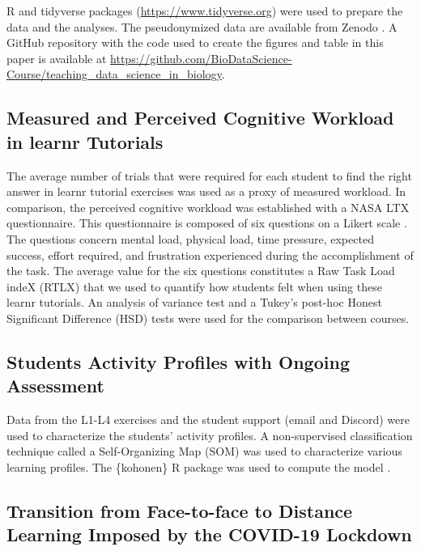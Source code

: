 \documentclass{aims} %
\theoremstyle{definition}
\begin{document}
R and tidyverse \cite{Wickham2019} packages
(\url{https://www.tidyverse.org}) were used to prepare the data and the
analyses. The pseudonymized data are available from Zenodo
\cite{Grosjeandataset2020, Grosjeandataset2019}. A GitHub repository
with the code used to create the figures and table in this paper is
available at
\url{https://github.com/BioDataScience-Course/teaching_data_science_in_biology}.

\hypertarget{measured-and-perceived-cognitive-workload-in-learnr-tutorials}{%
\subsection{Measured and Perceived Cognitive Workload in learnr
Tutorials}\label{measured-and-perceived-cognitive-workload-in-learnr-tutorials}}

The average number of trials that were required for each student to find
the right answer in learnr tutorial exercises was used as a proxy of
measured workload. In comparison, the perceived cognitive workload was
established with a NASA LTX questionnaire. This questionnaire is
composed of six questions on a Likert scale \cite{Hart1988}. The
questions concern mental load, physical load, time pressure, expected
success, effort required, and frustration experienced during the
accomplishment of the task. The average value for the six questions
constitutes a Raw Task Load indeX (RTLX) \cite{Byers1989} that we used
to quantify how students felt when using these learnr tutorials. An
analysis of variance test and a Tukey's post-hoc Honest Significant
Difference (HSD) tests were used for the comparison between courses.

\hypertarget{students-activity-profiles-with-ongoing-assessment}{%
\subsection{Students Activity Profiles with Ongoing
Assessment}\label{students-activity-profiles-with-ongoing-assessment}}

Data from the L1-L4 exercises and the student support (email and
Discord) were used to characterize the students' activity profiles. A
non-supervised classification technique called a Self-Organizing Map
(SOM) \cite{Kohonen1995} was used to characterize various learning
profiles. The \{kohonen\} R package was used to compute the model
\cite{Wehrens2018}.

\hypertarget{transition-from-face-to-face-to-distance-learning-imposed-by-the-covid-19-lockdown}{%
\subsection{Transition from Face-to-face to Distance Learning Imposed by
the COVID-19
Lockdown}\label{transition-from-face-to-face-to-distance-learning-imposed-by-the-covid-19-lockdown}}
\end{document}
